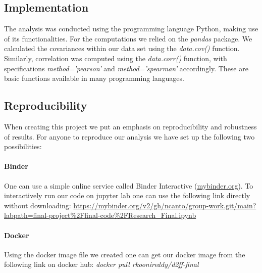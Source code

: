 \subsection{Implementation}
The analysis was conducted using the programming language Python, making use of its functionalities. For the computations we relied on the \emph{pandas} package. We calculated the covariances within our data set using the \emph{data.cov()} function. Similarly, correlation was computed using the \emph{data.corr()} function, with specifications \emph{method='pearson'} and \emph{method='spearman'} accordingly. These are basic functions available in many programming languages.

\subsection{Reproducibility}
When creating this project we put an emphasis on reproducibility and robustness of results. For anyone to reproduce our analysis we have set up the following two possibilities:

\paragraph{Binder} One can use a simple online service called Binder Interactive (\url{mybinder.org}). To interactively run our code on jupyter lab one can use the following link directly without downloading: \url{https://mybinder.org/v2/gh/ncanto/group-work.git/main?labpath=final-project\%2Ffinal-code\%2FResearch\_Final.ipynb}

\paragraph{Docker} Using the docker image file we created one can get our docker image from the following link on docker hub: \emph{docker pull rkoonireddy/d2ff-final}


